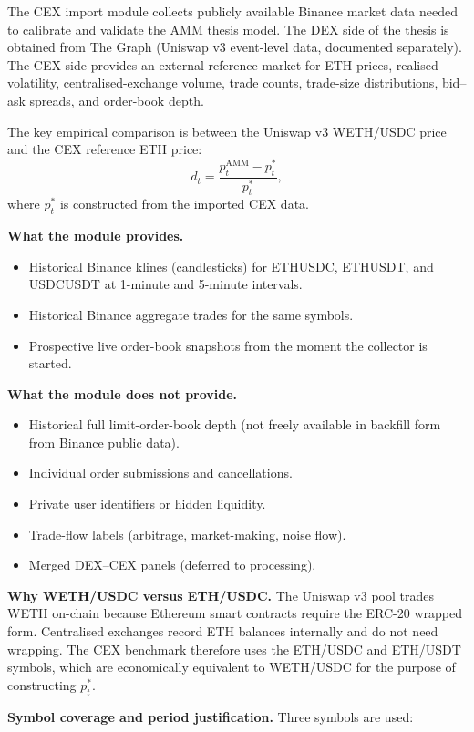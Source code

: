 \documentclass[11pt,a4paper]{article}
\begin{document}
The CEX import module collects publicly available Binance market data
needed to calibrate and validate the AMM thesis model. The DEX side of
the thesis is obtained from The Graph (Uniswap v3 event-level data,
documented separately). The CEX side provides an external reference
market for ETH prices, realised volatility, centralised-exchange volume,
trade counts, trade-size distributions, bid--ask spreads, and
order-book depth.

The key empirical comparison is between the Uniswap v3 WETH/USDC
price and the CEX reference ETH price:
\[
  d_t = \frac{p_t^{\mathrm{AMM}} - p_t^{*}}{p_t^{*}},
\]
where $p_t^{*}$ is constructed from the imported CEX data.

\noindent\textbf{What the module provides.}
\begin{itemize}
  \item Historical Binance klines (candlesticks) for ETHUSDC, ETHUSDT,
        and USDCUSDT at 1-minute and 5-minute intervals.
  \item Historical Binance aggregate trades for the same symbols.
  \item Prospective live order-book snapshots from the moment the
        collector is started.
\end{itemize}

\noindent\textbf{What the module does not provide.}
\begin{itemize}
  \item Historical full limit-order-book depth (not freely available
        in backfill form from Binance public data).
  \item Individual order submissions and cancellations.
  \item Private user identifiers or hidden liquidity.
  \item Trade-flow labels (arbitrage, market-making, noise flow).
  \item Merged DEX--CEX panels (deferred to processing).
\end{itemize}

\noindent\textbf{Why WETH/USDC versus ETH/USDC.} The Uniswap v3 pool
trades WETH on-chain because Ethereum smart contracts require the
ERC-20 wrapped form. Centralised exchanges record ETH balances
internally and do not need wrapping. The CEX benchmark therefore uses
the ETH/USDC and ETH/USDT symbols, which are economically equivalent
to WETH/USDC for the purpose of constructing $p_t^{*}$.

\noindent\textbf{Symbol coverage and period justification.}
Three symbols are used:
\end{document}
